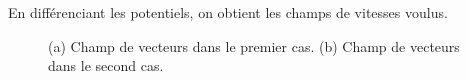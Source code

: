 \documentclass[12pt]{report}
\begin{document}
En différenciant les potentiels, on obtient les champs de vitesses voulus.

\begin{figure}[H]
  \caption{(a) Champ de vecteurs dans le premier cas. (b) Champ de vecteurs dans le second cas.}
\end{figure}
\end{document}
